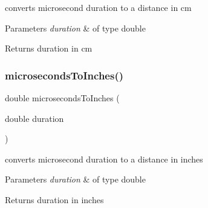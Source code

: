 converts microsecond duration to a distance in cm 


\begin{DoxyParams}{Parameters}
{\em duration} & of type double \\
\hline
\end{DoxyParams}
\begin{DoxyReturn}{Returns}
duration in cm 
\end{DoxyReturn}
\mbox{\label{ObstacleAvoidance_8ino_af3aa08ff26833db406e638b59de8a2e2}} 
\subsubsection{\texorpdfstring{microseconds\+To\+Inches()}{microsecondsToInches()}}
{\footnotesize\ttfamily double microseconds\+To\+Inches (\begin{DoxyParamCaption}\item[{double}]{duration }\end{DoxyParamCaption})}



converts microsecond duration to a distance in inches 


\begin{DoxyParams}{Parameters}
{\em duration} & of type double \\
\hline
\end{DoxyParams}
\begin{DoxyReturn}{Returns}
duration in inches 
\end{DoxyReturn}
